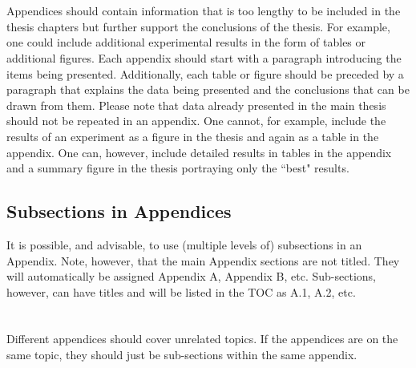 

\section{}\label{apx:appendix1}

Appendices should contain information that is too lengthy to be included in the thesis chapters but further support the conclusions of the thesis. For example, one could include additional experimental results in the form of tables or additional figures. Each appendix should start with a paragraph introducing the items being presented. Additionally, each table or figure should be preceded by a paragraph that explains the data being presented and the conclusions that can be drawn from them. Please note that data already presented in the main thesis should not be repeated in an appendix. One cannot, for example, include the results of an experiment as a figure in the thesis and again as a table in the appendix. One can, however, include detailed results in tables in the appendix and a summary figure in the thesis portraying only the ``best" results.

\subsection{Subsections in Appendices}\label{apx:appendix1:subsections}

It is possible, and advisable, to use (multiple levels of) subsections in an Appendix. Note, however, that the main Appendix sections are not titled. They will automatically be assigned Appendix A, Appendix B, etc. Sub-sections, however, can have titles and will be listed in the TOC as A.1, A.2, etc.

\section{}\label{apx:appendix2}

Different appendices should cover unrelated topics. If the appendices are on the same topic, they should just be sub-sections within the same appendix.